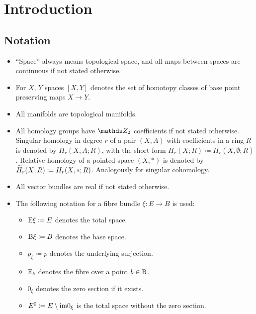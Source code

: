 % 

\chapter*{Introduction} %

\section*{Notation}
\begin{itemize}
\item \enquote{Space} always means topological space, and all maps
  between spaces are continuous if not stated otherwise.
\item For $X$, $Y$ spaces $[X,Y]$ denotes the set of homotopy classes
  of base point preserving maps $X\to Y$.
\item All manifolds are topological manifolds.
\item All homology groups have $\Zmod2$ coefficients if not stated
  otherwise. Singular homology in degree $r$ of a pair $(X,A)$ with
  coefficients in a ring $R$ is denoted by $H_r(X,A;R)$, with the
  short form $H_r(X;R)\coloneqq H_r(X,\emptyset;R)$. Relative homology
  of a pointed space $(X,\ast)$ is denoted by $\widetilde{H}_r(X;R)\coloneqq
  H_r(X,\ast;R)$. Analogously for singular cohomology.
\item All vector bundles are real if not stated otherwise.
\item The following notation for a fibre bundle $\xi\colon E\to B$ is used:
  \begin{itemize}
  \item $\mathrm{E}\xi\coloneqq E$ denotes the total space.
  \item $\mathrm{B}\xi\coloneqq B$ denotes the base space.
  \item $p_\xi\coloneqq p$ denotes the underlying surjection.
  \item $\mathrm{E}_b$ denotes the fibre over a point $b\in \B$.
  \item $0_\xi$ denotes the zero section if it exists.
  \item ${E}^0\coloneqq E\setminus\mathrm{im}0_{\xi}$
    is the total space without the zero section.

\end{itemize}
\end{itemize}
